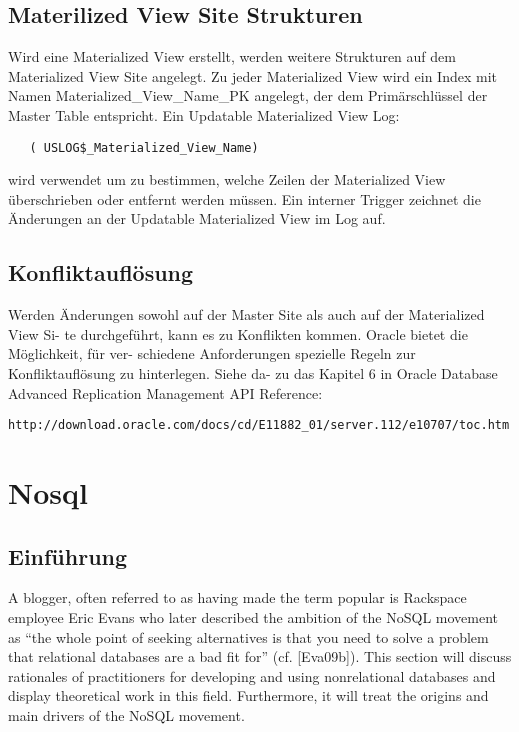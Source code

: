 \documentclass[a4paper,10pt,titlepage=false]{scrreprt}
\begin{document}
\section{Materilized View Site Strukturen} %
\label{sec:materilized_view_site_strukturen}
Wird eine Materialized View erstellt, werden weitere Strukturen auf dem Materialized View
Site angelegt.
Zu jeder Materialized View wird ein Index mit Namen Materialized\_View\_Name\_PK angelegt,
der dem Primärschlüssel der Master Table entspricht.
Ein Updatable Materialized View Log:\\
\begin{verbatim}
   ( USLOG$_Materialized_View_Name)
 \end{verbatim}  wird verwendet um
zu bestimmen, welche Zeilen der Materialized View überschrieben oder entfernt werden
müssen.
Ein interner Trigger zeichnet die Änderungen an der Updatable Materialized View im Log
auf.
\section{Konfliktauflösung} %
\label{sec:konfliktaufl_sung}
Werden Änderungen sowohl auf der Master Site als auch auf der Materialized View Si-
te durchgeführt, kann es zu Konflikten kommen. Oracle bietet die Möglichkeit, für ver-
schiedene Anforderungen spezielle Regeln zur Konfliktauflösung zu hinterlegen. Siehe da-
zu das Kapitel 6 in Oracle Database Advanced Replication Management API Reference:
\begin{verbatim}
http://download.oracle.com/docs/cd/E11882_01/server.112/e10707/toc.htm
\end{verbatim}

\chapter{Nosql}

\section{Einführung} %
\label{sec:einf_hrung}
A blogger, often referred to as having made the term popular is Rackspace employee Eric Evans who later
described the ambition of the NoSQL movement as “the whole point of seeking alternatives is that you
need to solve a problem that relational databases are a bad fit for” (cf. [Eva09b]).
This section will discuss rationales of practitioners for developing and using nonrelational databases and
display theoretical work in this field. Furthermore, it will treat the origins and main drivers of the NoSQL
movement.
\end{document}
